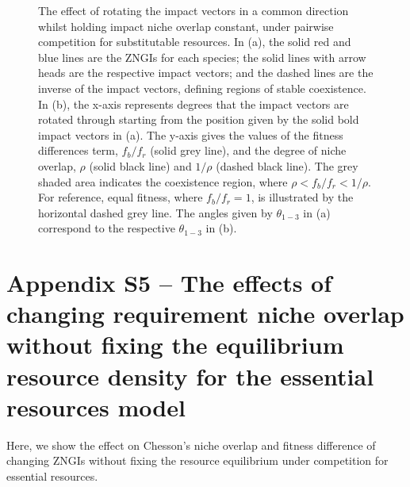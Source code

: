 \newpage
\begin{figure}[H]
	\centering
	\caption[The effect of rotating the impact vectors in a common direction whilst holding impact niche overlap constant, under pairwise competition for substitutable resources.]
		{\hspace{1mm}The effect of rotating the impact vectors in a common direction whilst holding impact niche overlap constant, under pairwise competition for substitutable resources. In (a), the solid red and blue lines are the ZNGIs for each species; the solid lines with arrow heads are the respective impact vectors; and the dashed lines are the inverse of the impact vectors, defining regions of stable coexistence. In (b), the x-axis represents degrees that the impact vectors are rotated through starting from the position given by the solid bold impact vectors in (a). The y-axis gives the values of the fitness differences term, $f_{b}/f_{r}$ (solid grey line), and the degree of niche overlap, $\rho$ (solid black line) and $1/\rho$ (dashed black line). The grey shaded area indicates the coexistence region, where $\rho<f_{b}/f_{r}<1/\rho$. For reference, equal fitness, where $f_{b}/f_{r}=1$, is illustrated by the horizontal dashed grey line. The angles given by $\theta_{1-3}$ in (a) correspond to the respective $\theta_{1-3}$ in (b).}
	\label{fig:impact-appendix-fig-fix}
\end{figure}



\clearpage
\section{Appendix S5 -- The effects of changing requirement niche overlap without fixing the equilibrium resource density for the essential resources model}
Here, we show the effect on Chesson's niche overlap and fitness difference of changing ZNGIs without fixing the resource equilibrium under competition for essential resources.
\par


